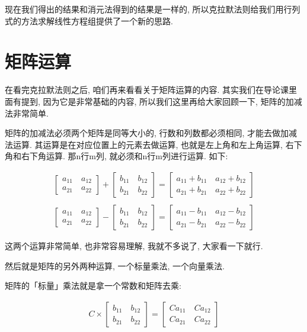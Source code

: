 现在我们得出的结果和消元法得到的结果是一样的, 所以克拉默法则给我们用行列式的方法求解线性方程组提供了一个新的思路. 

\section{矩阵运算}

在看完克拉默法则之后, 咱们再来看看关于矩阵运算的内容. 其实我们在导论课里面有提到, 因为它是非常基础的内容, 所以我们这里再给大家回顾一下, 矩阵的加减法非常简单. 

矩阵的加减法必须两个矩阵是同等大小的, 行数和列数都必须相同, 才能去做加减法运算. 其运算是在对应位置上的元素去做运算, 也就是左上角和左上角运算, 右下角和右下角运算. 那n行m列, 就必须和n行m列进行运算. 如下: 

\begin{align*}
\begin{bmatrix}
a_{11} \quad a_{12} \\
a_{21} \quad a_{22}
\end{bmatrix}
+
\begin{bmatrix}
b_{11} \quad b_{12} \\
b_{21} \quad b_{22}
\end{bmatrix}=
\begin{bmatrix}
a_{11} + b_{11} \quad a_{12} + b_{12} \\
a_{21} + b_{21} \quad a_{22} + b_{22}
\end{bmatrix} \\ \\
\begin{bmatrix}
a_{11} \quad a_{12} \\
a_{21} \quad a_{22}
\end{bmatrix}
-
\begin{bmatrix}
b_{11} \quad b_{12} \\
b_{21} \quad b_{22}
\end{bmatrix}=
\begin{bmatrix}
a_{11} - b_{11} \quad a_{12} - b_{12} \\
a_{21} - b_{21} \quad a_{22} - b_{22}
\end{bmatrix}
\end{align*}

这两个运算非常简单, 也非常容易理解, 我就不多说了, 大家看一下就行. 

然后就是矩阵的另外两种运算, 一个标量乘法, 一个向量乘法. 

矩阵的「标量」乘法就是拿一个常数和矩阵去乘: 

\begin{align*}
C \times
\begin{bmatrix}
b_{11} \quad b_{12} \\
b_{21} \quad b_{22}
\end{bmatrix}=
\begin{bmatrix}
Ca_{11} \quad Ca_{12} \\
Ca_{21} \quad Ca_{22}
\end{bmatrix}
\end{align*}

